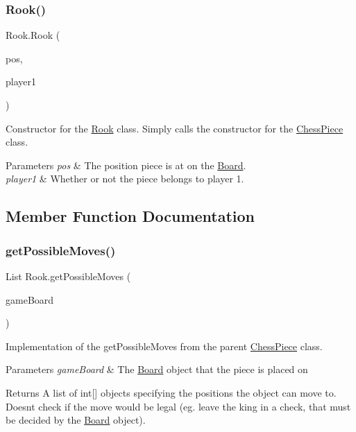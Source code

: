 \subsubsection{\texorpdfstring{Rook()}{Rook()}}
{\footnotesize\ttfamily Rook.\+Rook (\begin{DoxyParamCaption}\item[{@Not\+Null int \mbox{[}$\,$\mbox{]}}]{pos,  }\item[{boolean}]{player1 }\end{DoxyParamCaption})}

Constructor for the \mbox{\hyperlink{class_rook}{Rook}} class. Simply calls the constructor for the \mbox{\hyperlink{class_chess_piece}{Chess\+Piece}} class. 
\begin{DoxyParams}{Parameters}
{\em pos} & The position piece is at on the \mbox{\hyperlink{class_board}{Board}}. \\
\hline
{\em player1} & Whether or not the piece belongs to player 1. \\
\hline
\end{DoxyParams}


\subsection{Member Function Documentation}
\mbox{\label{class_rook_a6151ec8ce039caaa1b0447b7e9f71659}} 
\subsubsection{\texorpdfstring{get\+Possible\+Moves()}{getPossibleMoves()}}
{\footnotesize\ttfamily List Rook.\+get\+Possible\+Moves (\begin{DoxyParamCaption}\item[{@Not\+Null \mbox{\hyperlink{class_board}{Board}}}]{game\+Board }\end{DoxyParamCaption})}

Implementation of the get\+Possible\+Moves from the parent \mbox{\hyperlink{class_chess_piece}{Chess\+Piece}} class. 
\begin{DoxyParams}{Parameters}
{\em game\+Board} & The \mbox{\hyperlink{class_board}{Board}} object that the piece is placed on \\
\hline
\end{DoxyParams}
\begin{DoxyReturn}{Returns}
A list of int\mbox{[}\mbox{]} objects specifying the positions the object can move to. Doesn\textquotesingle{}t check if the move would be legal (eg. leave the king in a check, that must be decided by the \mbox{\hyperlink{class_board}{Board}} object). 
\end{DoxyReturn}
\mbox{\label{class_rook_aa112da23bdcf3cee4d7f96ee04717f99}} 
